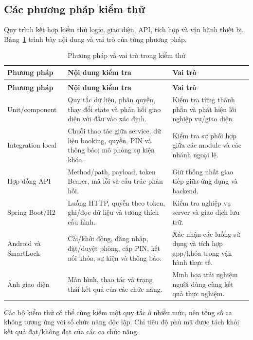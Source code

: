 \subsection{Các phương pháp kiểm thử}
Quy trình kết hợp kiểm thử logic, giao diện, API, tích hợp và vận hành thiết bị. Bảng~\ref{tab:evidence-levels} trình bày nội dung và vai trò của từng phương pháp.
{\tabletext\renewcommand{\arraystretch}{1.04}\begin{longtable}{>{\raggedright\arraybackslash}p{}>{\raggedright\arraybackslash}p{}>{\raggedright\arraybackslash}p{}}
\caption{Phương pháp và vai trò trong kiểm thử}\label{tab:evidence-levels}\\
\toprule \textbf{Phương pháp} & \textbf{Nội dung kiểm tra} & \textbf{Vai trò}\\\midrule
\endfirsthead
\multicolumn{3}{l}{\small Phương pháp và vai trò trong kiểm thử (tiếp)}\\
\toprule \textbf{Phương pháp} & \textbf{Nội dung kiểm tra} & \textbf{Vai trò}\\\midrule
\endhead
\bottomrule\endlastfoot
Unit/component & Quy tắc dữ liệu, phân quyền, thay đổi state và phản hồi giao diện với đầu vào xác định. & Kiểm tra từng thành phần và phát hiện lỗi nghiệp vụ/giao diện.\\
Integration local & Chuỗi thao tác giữa service, dữ liệu booking, quyền, PIN và thông báo; mô phỏng sự kiện khóa. & Kiểm tra sự phối hợp giữa các module và các nhánh ngoại lệ.\\
Hợp đồng API & Method/path, payload, token Bearer, mã lỗi và cấu trúc phản hồi. & Giữ thống nhất giao tiếp giữa ứng dụng và backend.\\
Spring Boot/H2 & Luồng HTTP, quyền theo token, ghi/đọc dữ liệu và tương thích cấu hình. & Kiểm tra nghiệp vụ server và giao dịch lưu trữ.\\
Android và SmartLock & Cài/khởi động, đăng nhập, đặt/duyệt phòng, cấp PIN, kết nối khóa, sự kiện và thông báo. & Xác nhận các luồng sử dụng và tích hợp app/khóa trong vận hành thực tế.\\
Ảnh giao diện & Màn hình, thao tác và trạng thái kết quả của các chức năng. & Minh họa trải nghiệm người dùng cùng kết quả thực nghiệm.\\
\end{longtable}}

Các bộ kiểm thử có thể cùng kiểm một quy tắc ở nhiều mức, nên tổng số ca không tương ứng với số chức năng độc lập. Chỉ tiêu độ phủ mã được tách khỏi kết quả đạt/không đạt của các ca chức năng.

